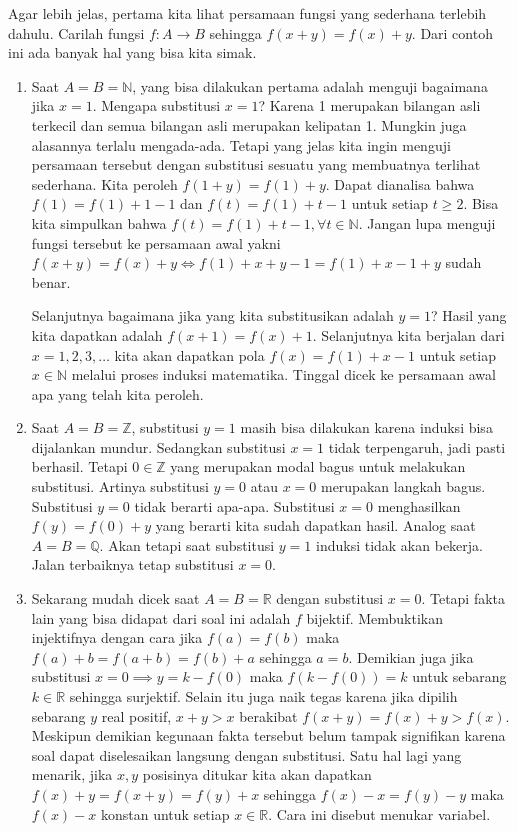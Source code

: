 \documentclass{article}
\begin{document}
Agar lebih jelas, pertama kita lihat persamaan fungsi yang sederhana terlebih dahulu. Carilah fungsi $f : A \rightarrow B$ sehingga $f(x+y) = f(x)+y$. Dari contoh ini ada banyak hal yang bisa kita simak.
\begin{enumerate}
\item Saat $A = B = \mathbb{N}$, yang bisa dilakukan pertama adalah menguji bagaimana jika $x = 1$. Mengapa substitusi $x = 1$? Karena 1 merupakan bilangan asli terkecil dan semua bilangan asli merupakan kelipatan 1. Mungkin juga alasannya terlalu mengada-ada. Tetapi yang jelas kita ingin menguji persamaan tersebut dengan substitusi sesuatu yang membuatnya terlihat sederhana. Kita peroleh $f(1+y) = f(1)+y$. Dapat dianalisa bahwa $f(1) = f(1)+1-1$ dan $f(t) = f(1)+t-1$ untuk setiap $t \ge 2$. Bisa kita simpulkan bahwa $f(t) = f(1)+t-1, \forall t \in \mathbb{N}$. Jangan lupa menguji fungsi tersebut ke persamaan awal yakni $f(x+y) = f(x)+y \iff f(1)+x+y-1 = f(1)+x-1+y$ sudah benar.

Selanjutnya bagaimana jika yang kita substitusikan adalah $y = 1$? Hasil yang kita dapatkan adalah $f(x+1) = f(x)+1$. Selanjutnya kita berjalan dari $x = 1, 2, 3, \dots$ kita akan dapatkan pola $f(x) = f(1)+x-1$ untuk setiap $x \in \mathbb{N}$ melalui proses induksi matematika. Tinggal dicek ke persamaan awal apa yang telah kita peroleh.

\item Saat $A = B = \mathbb{Z}$, substitusi $y = 1$ masih bisa dilakukan karena induksi bisa dijalankan mundur. Sedangkan substitusi $x = 1$ tidak terpengaruh, jadi pasti berhasil. Tetapi $0 \in \mathbb{Z}$ yang merupakan modal bagus untuk melakukan substitusi. Artinya substitusi $y = 0$ atau $x = 0$ merupakan langkah bagus. Substitusi $y = 0$ tidak berarti apa-apa. Substitusi $x = 0$ menghasilkan $f(y) = f(0)+y$ yang berarti kita sudah dapatkan hasil. Analog saat $A = B = \mathbb{Q}$. Akan tetapi saat substitusi $y = 1$ induksi tidak akan bekerja. Jalan terbaiknya tetap substitusi $x = 0$.

\item Sekarang mudah dicek saat $A = B = \mathbb{R}$ dengan substitusi $x = 0$. Tetapi fakta lain yang bisa didapat dari soal ini adalah $f$ bijektif. Membuktikan injektifnya dengan cara jika $f(a) = f(b)$ maka $f(a)+b = f(a+b) = f(b)+a$ sehingga $a = b$. Demikian juga jika substitusi $x = 0 \implies y = k - f(0)$ maka $f(k - f(0)) = k$ untuk sebarang $k \in \mathbb{R}$ sehingga surjektif. Selain itu juga naik tegas karena jika dipilih sebarang $y$ real positif, $x+y > x$ berakibat $f(x+y) = f(x)+y > f(x)$. Meskipun demikian kegunaan fakta tersebut belum tampak signifikan karena soal dapat diselesaikan langsung dengan substitusi. Satu hal lagi yang menarik, jika $x, y$ posisinya ditukar kita akan dapatkan $f(x)+y = f(x+y) = f(y)+x$ sehingga $f(x)-x = f(y)-y$ maka $f(x)-x$ konstan untuk setiap $x \in \mathbb{R}$. Cara ini disebut menukar variabel.


\end{enumerate}
\end{document}
